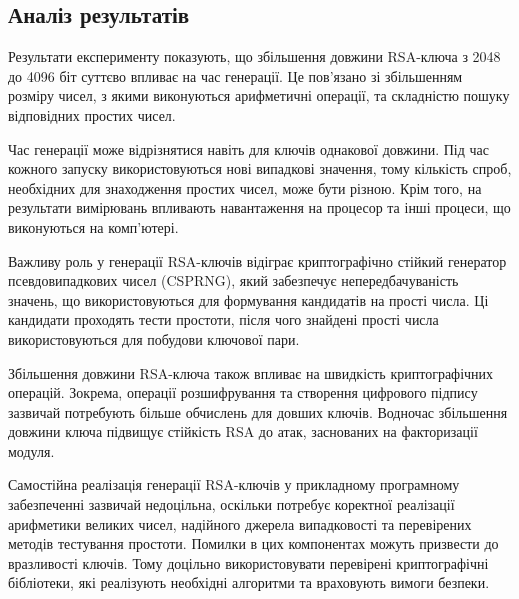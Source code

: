 \subsection{Аналіз результатів}

Результати експерименту показують, що збільшення довжини RSA-ключа з 2048 до 4096 біт суттєво впливає на час генерації. Це пов'язано зі збільшенням розміру чисел, з якими виконуються арифметичні операції, та складністю пошуку відповідних простих чисел.

Час генерації може відрізнятися навіть для ключів однакової довжини. Під час кожного запуску використовуються нові випадкові значення, тому кількість спроб, необхідних для знаходження простих чисел, може бути різною. Крім того, на результати вимірювань впливають навантаження на процесор та інші процеси, що виконуються на комп'ютері.

Важливу роль у генерації RSA-ключів відіграє криптографічно стійкий генератор псевдовипадкових чисел (CSPRNG), який забезпечує непередбачуваність значень, що використовуються для формування кандидатів на прості числа. Ці кандидати проходять тести простоти, після чого знайдені прості числа використовуються для побудови ключової пари.

Збільшення довжини RSA-ключа також впливає на швидкість криптографічних операцій. Зокрема, операції розшифрування та створення цифрового підпису зазвичай потребують більше обчислень для довших ключів. Водночас збільшення довжини ключа підвищує стійкість RSA до атак, заснованих на факторизації модуля.

Самостійна реалізація генерації RSA-ключів у прикладному програмному забезпеченні зазвичай недоцільна, оскільки потребує коректної реалізації арифметики великих чисел, надійного джерела випадковості та перевірених методів тестування простоти. Помилки в цих компонентах можуть призвести до вразливості ключів. Тому доцільно використовувати перевірені криптографічні бібліотеки, які реалізують необхідні алгоритми та враховують вимоги безпеки.

